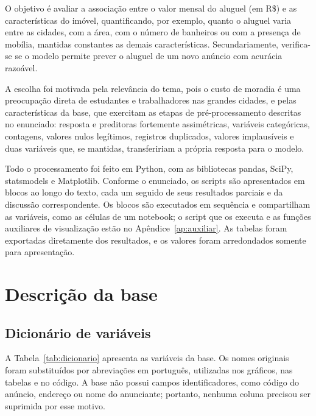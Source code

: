 \documentclass[12pt,a4paper]{article}
\begin{document}
O objetivo é avaliar a associação entre o valor mensal do aluguel (em R\$) e as características do imóvel, quantificando, por exemplo, quanto o aluguel varia entre as cidades, com a área, com o número de banheiros ou com a presença de mobília, mantidas constantes as demais características. Secundariamente, verifica-se se o modelo permite prever o aluguel de um novo anúncio com acurácia razoável.

A escolha foi motivada pela relevância do tema, pois o custo de moradia é uma preocupação direta de estudantes e trabalhadores nas grandes cidades, e pelas características da base, que exercitam as etapas de pré-processamento descritas no enunciado: resposta e preditoras fortemente assimétricas, variáveis categóricas, contagens, valores nulos legítimos, registros duplicados, valores implausíveis e duas variáveis que, se mantidas, transfeririam a própria resposta para o modelo.

Todo o processamento foi feito em Python, com as bibliotecas pandas, SciPy, statsmodels \cite{statsmodels} e Matplotlib. Conforme o enunciado, os scripts são apresentados em blocos ao longo do texto, cada um seguido de seus resultados parciais e da discussão correspondente. Os blocos são executados em sequência e compartilham as variáveis, como as células de um notebook; o script que os executa e as funções auxiliares de visualização estão no Apêndice~\ref{ap:auxiliar}. As tabelas foram exportadas diretamente dos resultados, e os valores foram arredondados somente para apresentação.

\section{Descrição da base}

\subsection{Dicionário de variáveis}

A Tabela~\ref{tab:dicionario} apresenta as variáveis da base. Os nomes originais foram substituídos por abreviações em português, utilizadas nos gráficos, nas tabelas e no código. A base não possui campos identificadores, como código do anúncio, endereço ou nome do anunciante; portanto, nenhuma coluna precisou ser suprimida por esse motivo.
\end{document}
